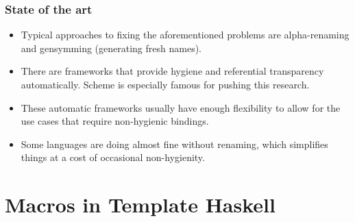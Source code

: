 \documentclass[hyperref={bookmarks=false}]{beamer}
\begin{document}
\begin{frame}[fragile]
\frametitle{State of the art}

\begin{itemize}
\item Typical approaches to fixing the aforementioned problems
are alpha-renaming and gensymming (generating fresh names).
\item There are frameworks that provide hygiene and referential transparency automatically.
Scheme is especially famous for pushing this research.
\item These automatic frameworks usually have enough flexibility to allow for
the use cases that require non-hygienic bindings.
\item Some languages are doing almost fine without renaming,
which simplifies things at a cost of occasional non-hygienity.
\end{itemize}

\end{frame}

\section{Macros in Template Haskell}
\end{document}
